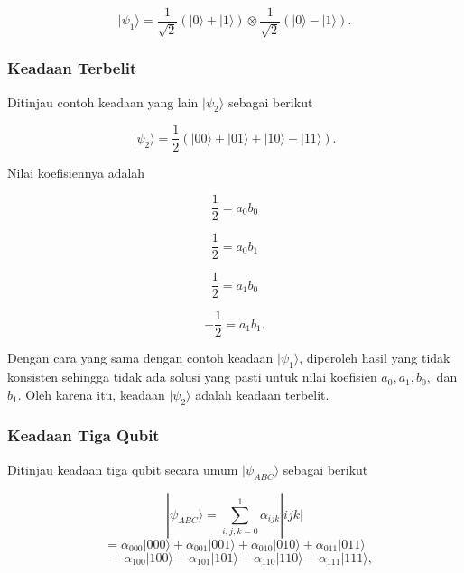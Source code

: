 \begin{equation}
|\psi_1\rangle =
\frac{1}{\sqrt{2}}
\left(
|0\rangle + |1\rangle
\right)
\otimes
\frac{1}{\sqrt{2}}
\left(
|0\rangle - |1\rangle
\right).
\end{equation}

\subsubsection{Keadaan Terbelit}

Ditinjau contoh keadaan yang lain $|\psi_2\rangle$ sebagai berikut

\begin{equation}
|\psi_2\rangle =
\frac{1}{2}
\left(
|00\rangle + |01\rangle + |10\rangle - |11\rangle
\right).
\end{equation}

Nilai koefisiennya adalah

\begin{equation}
\frac{1}{2} = a_0 b_0
\end{equation}

\begin{equation}
\frac{1}{2} = a_0 b_1
\end{equation}

\begin{equation}
\frac{1}{2} = a_1 b_0
\end{equation}

\begin{equation}
-\frac{1}{2} = a_1 b_1.
\end{equation}

Dengan cara yang sama dengan contoh keadaan $|\psi_1\rangle$, diperoleh hasil yang tidak
konsisten sehingga tidak ada solusi yang pasti untuk nilai koefisien $a_0, a_1, b_0,$ dan
$b_1$. Oleh karena itu, keadaan $|\psi_2\rangle$ adalah keadaan terbelit.

\subsubsection{Keadaan Tiga Qubit}

Ditinjau keadaan tiga qubit secara umum $|\psi_{ABC}\rangle$ sebagai berikut

\begin{equation}
|\psi_{ABC}\rangle
=
\sum_{i,j,k=0}^{1}
\alpha_{ijk} |ijk|
\end{equation}
\begin{equation}
=
\alpha_{000} |000\rangle
+ \alpha_{001} |001\rangle
+ \alpha_{010} |010\rangle
+ \alpha_{011} |011\rangle
\end{equation}
\begin{equation}
\quad
+ \alpha_{100} |100\rangle
+ \alpha_{101} |101\rangle
+ \alpha_{110} |110\rangle
+ \alpha_{111} |111\rangle ,
\end{equation}

